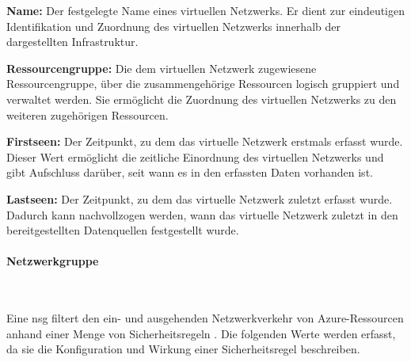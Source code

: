 \begin{compactitem}

    \item \textbf{Name:} Der festgelegte Name eines virtuellen Netzwerks.
    Er dient zur eindeutigen Identifikation und Zuordnung des virtuellen
    Netzwerks innerhalb der dargestellten Infrastruktur.

    \item \textbf{Ressourcengruppe:} Die dem virtuellen Netzwerk zugewiesene
    Ressourcengruppe, über die zusammengehörige Ressourcen logisch gruppiert
    und verwaltet werden. Sie ermöglicht die Zuordnung des virtuellen Netzwerks
    zu den weiteren zugehörigen Ressourcen.

    \item \textbf{Firstseen:} Der Zeitpunkt, zu dem das virtuelle Netzwerk
    erstmals erfasst wurde. Dieser Wert ermöglicht die zeitliche Einordnung
    des virtuellen Netzwerks und gibt Aufschluss darüber, seit wann es in den
    erfassten Daten vorhanden ist.

    \item \textbf{Lastseen:} Der Zeitpunkt, zu dem das virtuelle Netzwerk
    zuletzt erfasst wurde. Dadurch kann nachvollzogen werden, wann das
    virtuelle Netzwerk zuletzt in den bereitgestellten Datenquellen
    festgestellt wurde.
    
\end{compactitem}

\paragraph{Netzwerkgruppe}
\label{par:network-group}

~

Eine \gls{nsg} filtert den ein- und ausgehenden Netzwerkverkehr von Azure-Ressourcen
anhand einer Menge von Sicherheitsregeln \cite{microsoft2026nsg}. Die folgenden
Werte werden erfasst, da sie die Konfiguration und Wirkung einer Sicherheitsregel
beschreiben.

